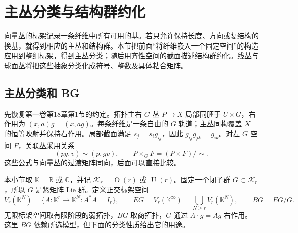 
% 
% 
% 

\section{主丛分类与结构群约化}
\label{g2:sec:1904}

向量丛的标架记录一条纤维中所有可用的基。若只允许保持长度、方向或复结构的换基，就得到相应的主丛和结构群。本节把前面“将纤维嵌入一个固定空间”的构造应用到整组标架，得到主丛分类；随后用齐性空间的截面描述结构群约化。线丛与球面丛将把这些抽象分类化成符号、整数及具体粘合矩阵。

\subsection{主丛分类和 BG}
\label{g2:subsec:1904:01}

先恢复第一卷第18章第1节的约定。拓扑主右 \(G\) 丛 \(P\to X\) 局部同胚于 \(U\times G\)，右作用为 \((x,a)g=(x,ag)\)。每条纤维是一条自由的 \(G\) 轨道；主丛同构覆盖 \(X\) 的恒等映射并保持右作用。局部截面满足 \(s_j=s_i g_{ij}\)，因此 \(g_{ij}g_{jk}=g_{ik}\)。对左 \(G\) 空间 \(F\)，关联丛采用关系
\[
	(pg,v)\sim(p,gv),\qquad P\times_G F=(P\times F)/\!\sim.
\]
这些公式与向量丛的过渡矩阵同向，后面可以直接比较。

\ProseParagraphBreak

本小节取 \(\mathbb K=\mathbb R\) 或 \(\mathbb C\)，并记 \(\mathcal K_r=\operatorname{O}(r)\) 或 \(\operatorname{U}(r)\)。固定一个闭子群 \(G\subset \mathcal K_r\)，所以 \(G\) 是紧矩阵 Lie 群。定义正交标架空间
\[
	V_r(\mathbb K^N)=\{A:\mathbb K^r\to \mathbb K^N:A^*A=I_r\},\qquad
	EG=V_r(\mathbb K^\infty)=\bigcup_{N\ge r}V_r(\mathbb K^N),\qquad BG=EG/G.
\]
无限标架空间取有限阶段的弱拓扑，\(BG\) 取商拓扑，\(G\) 通过 \(A\cdot g=Ag\) 右作用。这里 \(BG\) 依赖所选模型，但下面的分类性质给出它的用途。

